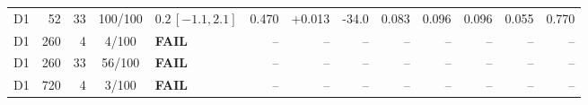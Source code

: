 \begin{longtable}{crrcp{33mm}rrrrrrrr}
D1 & 52 & 33 & 100/100 & \(0.2\,[-1.1,2.1]\) & 0.470 & +0.013 & -34.0 & 0.083 & 0.096 & 0.096 & 0.055 & 0.770\\
D1 & 260 & 4 & 4/100 & \textbf{FAIL} & -- & -- & -- & -- & -- & -- & -- & --\\
D1 & 260 & 33 & 56/100 & \textbf{FAIL} & -- & -- & -- & -- & -- & -- & -- & --\\
D1 & 720 & 4 & 3/100 & \textbf{FAIL} & -- & -- & -- & -- & -- & -- & -- & --\\

\end{longtable}
